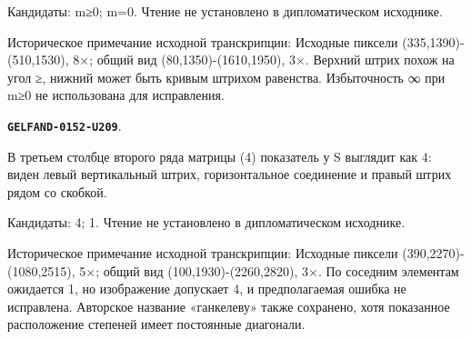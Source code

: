 \documentclass[11pt]{article}
\theoremstyle{definition}
\theoremstyle{remark}
\begin{document}
Кандидаты: m≥0; m=0. Чтение не установлено в дипломатическом исходнике.\par
Историческое примечание исходной транскрипции: Исходные пиксели (335,1390)-(510,1530), 8×; общий вид (80,1350)-(1610,1950), 3×. Верхний штрих похож на угол ≥, нижний может быть кривым штрихом равенства. Избыточность ∞ при m≥0 не использована для исправления.\par\medskip
\par\noindent\leavevmode{}\label{GELFAND-0152-U209}\label{GELFAND-P001399:matrix-row-2-col-3:note}\textbf{\texttt{GELFAND-0152-U209}}.\nopagebreak[4]\par
В третьем столбце второго ряда матрицы (4) показатель у S выглядит как 4: виден левый вертикальный штрих, горизонтальное соединение и правый штрих рядом со скобкой.\par
Кандидаты: 4; 1. Чтение не установлено в дипломатическом исходнике.\par
Историческое примечание исходной транскрипции: Исходные пиксели (390,2270)-(1080,2515), 5×; общий вид (100,1930)-(2260,2820), 3×. По соседним элементам ожидается 1, но изображение допускает 4, и предполагаемая ошибка не исправлена. Авторское название «ганкелеву» также сохранено, хотя показанное расположение степеней имеет постоянные диагонали.\par\medskip
\end{document}
